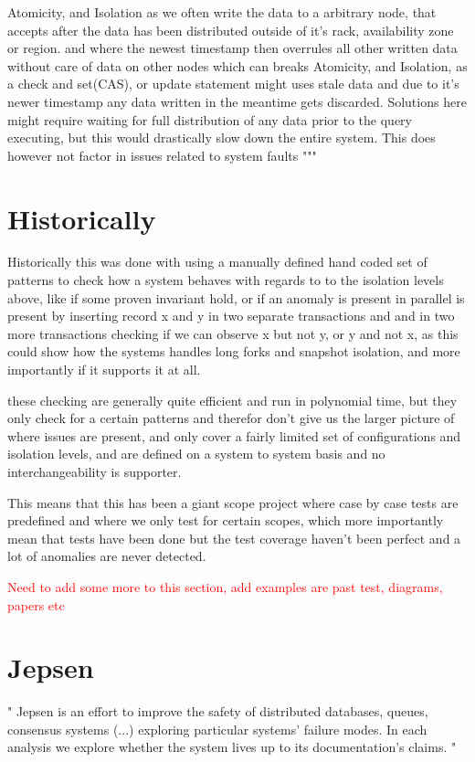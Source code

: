 \documentclass[a4paper,10pt,titlepage]{report}
\begin{document}
Atomicity, and Isolation as we often write the data to a arbitrary node, that accepts after the data has been distributed outside of it's rack, availability zone or region. and where the newest timestamp then overrules all other written data without care of data on other nodes which can breaks Atomicity, and Isolation, as a check and set(CAS), or update statement might uses stale data and due to it's newer timestamp any data written in the meantime gets discarded. Solutions here might require waiting for full distribution of any data prior to the query executing, but this would drastically slow down the entire system. This does however not factor in issues related to system faults
"""

\section{Historically}

Historically this was done with using a manually defined hand coded set of patterns to check how a system behaves with regards to to the isolation levels above, like if some proven invariant hold, or if an anomaly is present in parallel is present by inserting record x and y in two separate transactions and and in two more transactions checking if we can observe x but not y, or y and not x, as this could show how the systems handles long forks and snapshot isolation, and more importantly if it supports it at all.

these checking are generally quite efficient and run in polynomial time, but they only check for a certain patterns and therefor don't give us the larger picture of where issues are present, and only cover a fairly limited set of configurations and isolation levels, and are defined on a system to system basis and no interchangeability is supporter.

This means that this has been a giant scope project where case by case tests are predefined and where we only test for certain scopes, which more importantly mean that tests have been done but the test coverage haven't been perfect and a lot of anomalies are never detected.

\textcolor{red}{Need to add some more to this section, add examples are past test, diagrams, papers etc}

\section{Jepsen}
"
Jepsen is an effort to improve the safety of distributed databases, queues, consensus systems  (...) exploring particular systems' failure modes. In each analysis we explore whether the system lives up to its documentation's claims.
"\cite{jepsonio}
\\
\vspace{5mm}
\end{document}

